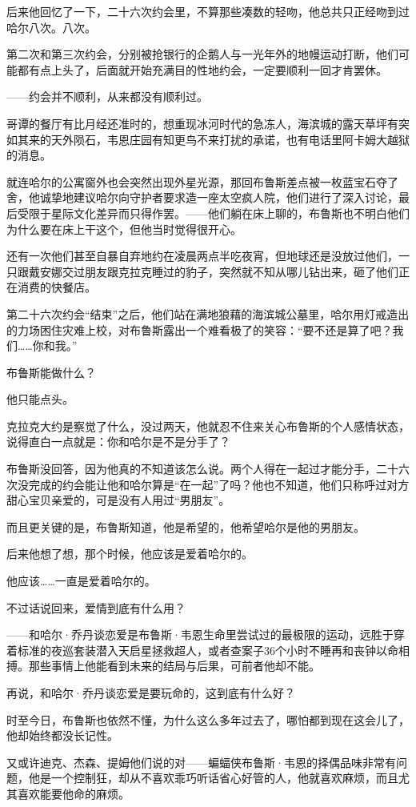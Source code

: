 \documentclass[../main]{subfiles}
\begin{document}
后来他回忆了一下，二十六次约会里，不算那些凑数的轻吻，他总共只正经吻到过哈尔八次。八次。

第二次和第三次约会，分别被抢银行的企鹅人与一光年外的地幔运动打断，他们可能都有点上头了，后面就开始充满目的性地约会，一定要顺利一回才肯罢休。

——约会并不顺利，从来都没有顺利过。

哥谭的餐厅有比月经还准时的，想重现冰河时代的急冻人，海滨城的露天草坪有突如其来的天外陨石，韦恩庄园有知更鸟不来打扰的承诺，也有电话里阿卡姆大越狱的消息。

就连哈尔的公寓窗外也会突然出现外星光源，那回布鲁斯差点被一枚蓝宝石夺了舍，他诚挚地建议哈尔向守护者要求造一座太空疯人院，他们进行了深入讨论，最后受限于星际文化差异而只得作罢。——他们躺在床上聊的，布鲁斯也不明白他们为什么要在床上干这个，但他当时觉得很开心。

还有一次他们甚至自暴自弃地约在凌晨两点半吃夜宵，但地球还是没放过他们，一只跟戴安娜交过朋友跟克拉克睡过的豹子，突然就不知从哪儿钻出来，砸了他们正在消费的快餐店。

第二十六次约会“结束”之后，他们站在满地狼藉的海滨城公墓里，哈尔用灯戒造出的力场困住灾难上校，对布鲁斯露出一个难看极了的笑容：“要不还是算了吧？我们……你和我。”

布鲁斯能做什么？

他只能点头。

克拉克大约是察觉了什么，没过两天，他就忍不住来关心布鲁斯的个人感情状态，说得直白一点就是：你和哈尔是不是分手了？

布鲁斯没回答，因为他真的不知道该怎么说。两个人得在一起过才能分手，二十六次没完成的约会能让他和哈尔算是“在一起”了吗？他也不知道，他们只称呼过对方甜心宝贝亲爱的，可是没有人用过“男朋友”。

而且更关键的是，布鲁斯知道，他是希望的，他希望哈尔是他的男朋友。

后来他想了想，那个时候，他应该是爱着哈尔的。

他应该……一直是爱着哈尔的。

不过话说回来，爱情到底有什么用？

——和哈尔·乔丹谈恋爱是布鲁斯·韦恩生命里尝试过的最极限的运动，远胜于穿着标准的夜巡套装潜入天启星拯救超人，或者查案子36个小时不睡再和丧钟以命相搏。那些事情上他能看到未来的结局与后果，可前者他却不能。

再说，和哈尔·乔丹谈恋爱是要玩命的，这到底有什么好？

时至今日，布鲁斯也依然不懂，为什么这么多年过去了，哪怕都到现在这会儿了，他却始终都没长记性。

又或许迪克、杰森、提姆他们说的对——蝙蝠侠布鲁斯·韦恩的择偶品味非常有问题，他是一个控制狂，却从不喜欢乖巧听话省心好管的人，他就喜欢麻烦，而且尤其喜欢能要他命的麻烦。
\end{document}
